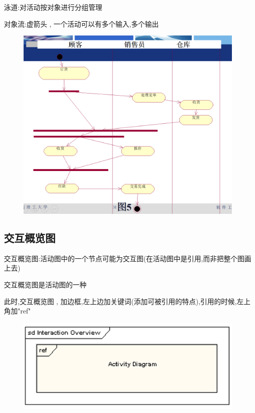 \documentclass[UTF8,a4paper]{ctexart}
\begin{document}
泳道:对活动按对象进行分组管理

对象流:虚箭头 , 一个活动可以有多个输入,多个输出

\begin{figure}[H]
  \centering
  \includegraphics[scale = 0.3]{assets/SoftwareEngineering_f1548.png}
\end{figure}

\subsection{交互概览图}
交互概览图:活动图中的一个节点可能为交互图(在活动图中是引用,而非把整个图画上去)

交互概览图是活动图的一种

此时,交互概览图 , 加边框,左上边加关键词(添加可被引用的特点),引用的时候,左上角加"ref"

\begin{figure}[H]
  \centering
  \includegraphics[scale = 0.3]{assets/SoftwareEngineering_c78cc.png}
\end{figure}
\end{document}
